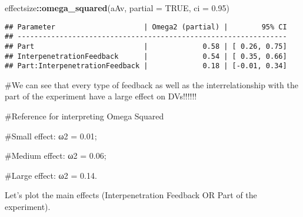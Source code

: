 \documentclass[
]{article}
\newenvironment{Shaded}{\begin{snugshade}}{\end{snugshade}}
\newcommand{\DataTypeTok}[1]{\textcolor[rgb]{0.13,0.29,0.53}{#1}}
\newcommand{\FloatTok}[1]{\textcolor[rgb]{0.00,0.00,0.81}{#1}}
\newcommand{\KeywordTok}[1]{\textcolor[rgb]{0.13,0.29,0.53}{\textbf{#1}}}
\newcommand{\NormalTok}[1]{#1}
\newcommand{\OperatorTok}[1]{\textcolor[rgb]{0.81,0.36,0.00}{\textbf{#1}}}
\newcommand{\OtherTok}[1]{\textcolor[rgb]{0.56,0.35,0.01}{#1}}
\begin{document}
\begin{Shaded}
\begin{Highlighting}[]
\NormalTok{effectsize}\OperatorTok{::}\KeywordTok{omega_squared}\NormalTok{(aAv, }\DataTypeTok{partial =} \OtherTok{TRUE}\NormalTok{, }\DataTypeTok{ci =} \FloatTok{0.95}\NormalTok{)}
\end{Highlighting}
\end{Shaded}

\begin{verbatim}
## Parameter                     | Omega2 (partial) |        95% CI
## ----------------------------------------------------------------
## Part                          |             0.58 | [ 0.26, 0.75]
## InterpenetrationFeedback      |             0.54 | [ 0.35, 0.66]
## Part:InterpenetrationFeedback |             0.18 | [-0.01, 0.34]
\end{verbatim}

\#We can see that every type of feedback as well as the
interrelationship with the part of the experiment have a large effect on
DVs!!!!!!

\#Reference for interpreting Omega Squared

\#Small effect: ω2 = 0.01;

\#Medium effect: ω2 = 0.06;

\#Large effect: ω2 = 0.14.

Let's plot the main effects (Interpenetration Feedback OR Part of the
experiment).
\end{document}
